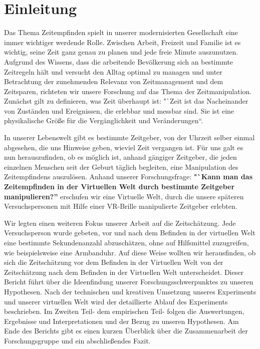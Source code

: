 \documentclass{Bericht}
\begin{document}
\maketitle


\tableofcontents
\clearpage

\section{Einleitung} %
	Das Thema Zeitempfinden spielt in unserer modernisierten Gesellschaft eine immer wichtiger werdende Rolle. Zwischen Arbeit, Freizeit und Familie ist es wichtig, seine Zeit ganz genau zu planen und jede freie Minute auszunutzen. Aufgrund des Wissens, dass die arbeitende Bevölkerung sich an bestimmte Zeitregeln hält und versucht den Alltag optimal zu managen und unter Betrachtung der zunehmenden Relevanz von Zeitmanagement und dem Zeitsparen, richteten wir unsere Forschung auf das Thema der Zeitmanipulation. Zunächst gilt zu definieren, was Zeit überhaupt ist: "`Zeit ist das Nacheinander von Zuständen und Ereignissen, die erlebbar und messbar sind. Sie ist eine physikalische Größe für die Vergänglichkeit und Veränderungen“. 

	In unserer Lebenswelt gibt es bestimmte Zeitgeber, von der Uhrzeit selber einmal abgesehen, die uns Hinweise geben, wieviel Zeit vergangen ist. Für uns galt es nun herauszufinden, ob es möglich ist, anhand gängiger Zeitgeber, die jeden einzelnen Menschen seit der Geburt täglich begleiten, eine Manipulation des Zeitempfindens auszulösen. Anhand unserer Forschungsfrage: \textbf{"`Kann man das Zeitempfinden in der Virtuellen Welt durch bestimmte Zeitgeber manipulieren?''} erschufen wir eine Virtuelle Welt, durch die unsere späteren Versuchspersonen mit Hilfe einer VR-Brille manipulierte Zeitgeber erlebten. 

	 Wir legten einen weiteren Fokus unserer Arbeit auf die Zeitschätzung. Jede Versuchsperson wurde gebeten, vor und nach dem Befinden in der virtuellen Welt eine bestimmte Sekundenanzahl abzuschätzen, ohne auf Hilfsmittel zuzugreifen, wie beispielsweise eine Armbanduhr. Auf diese Weise wollten wir herausfinden, ob sich die Zeitschätzung vor dem Befinden in der Virtuellen Welt von der Zeitschätzung nach dem Befinden in der Virtuellen Welt unterscheidet.
Dieser Bericht führt über die Ideenfindung unserer Forschungsschwerpunktes zu unseren Hypothesen. Nach der technischen und kreativen Umsetzung unseres Experiments und unserer virtuellen Welt wird der detaillierte Ablauf des Experiments beschrieben. Im Zweiten Teil- dem empirischen Teil- folgen die Auswertungen, Ergebnisse und Interpretationen und der Bezug zu unseren Hypothesen. Am Ende des Berichts gibt es einen kurzen Überblick über die Zusammenarbeit der Forschungsgruppe und ein abschließendes Fazit. 
\end{document}
